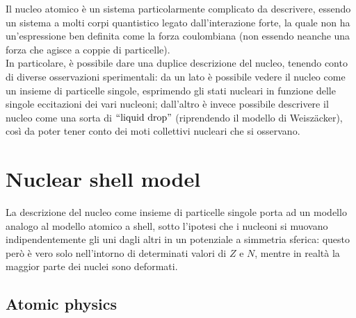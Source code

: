 
Il nucleo atomico è un sistema particolarmente complicato da descrivere, essendo un sistema a molti corpi quantistico legato dall'interazione forte, la quale non ha un'espressione ben definita come la forza coulombiana (non essendo neanche una forza che agisce a coppie di particelle).\\
In particolare, è possibile dare una duplice descrizione del nucleo, tenendo conto di diverse osservazioni sperimentali: da un lato è possibile vedere il nucleo come un insieme di particelle singole, esprimendo gli stati nucleari in funzione delle singole eccitazioni dei vari nucleoni; dall'altro è invece possibile descrivere il nucleo come una sorta di $ ``\text{liquid drop}" $ (riprendendo il modello di Weiszäcker), così da poter tener conto dei moti collettivi nucleari che si osservano.

\section{Nuclear shell model}

La descrizione del nucleo come insieme di particelle singole porta ad un modello analogo al modello atomico a shell, sotto l'ipotesi che i nucleoni si muovano indipendentemente gli uni dagli altri in un potenziale a simmetria sferica: questo però è vero solo nell'intorno di determinati valori di $ Z $ e $ N $, mentre in realtà la maggior parte dei nuclei sono deformati.

\subsection{Atomic physics}


